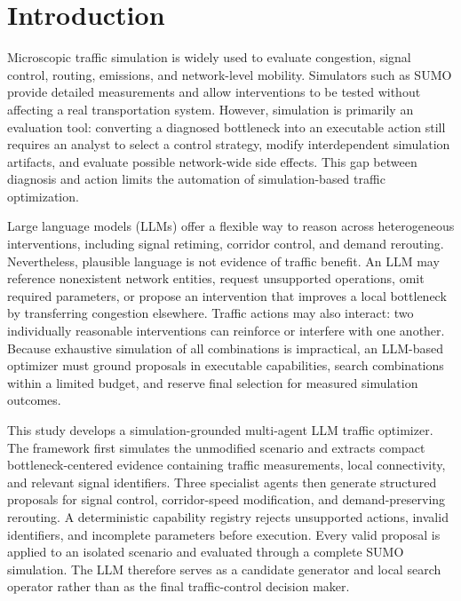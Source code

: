\section{Introduction}
\label{sec:intro}

Microscopic traffic simulation is widely used to evaluate congestion, signal
control, routing, emissions, and network-level mobility.  Simulators such as
SUMO provide detailed measurements and allow interventions to be tested without
affecting a real transportation system.  However, simulation is primarily an
evaluation tool: converting a diagnosed bottleneck into an executable action
still requires an analyst to select a control strategy, modify interdependent
simulation artifacts, and evaluate possible network-wide side effects.  This
gap between diagnosis and action limits the automation of simulation-based
traffic optimization.

Large language models (LLMs) offer a flexible way to reason across heterogeneous
interventions, including signal retiming, corridor control, and demand
rerouting.  Nevertheless, plausible language is not evidence of traffic
benefit.  An LLM may reference nonexistent network entities, request unsupported
operations, omit required parameters, or propose an intervention that improves
a local bottleneck by transferring congestion elsewhere.  Traffic actions may
also interact: two individually reasonable interventions can reinforce or
interfere with one another.  Because exhaustive simulation of all combinations
is impractical, an LLM-based optimizer must ground proposals in executable
capabilities, search combinations within a limited budget, and reserve final
selection for measured simulation outcomes.

This study develops a simulation-grounded multi-agent LLM traffic optimizer.
The framework first simulates the unmodified scenario and extracts compact
bottleneck-centered evidence containing traffic measurements, local
connectivity, and relevant signal identifiers.  Three specialist agents then
generate structured proposals for signal control, corridor-speed modification,
and demand-preserving rerouting.  A deterministic capability registry rejects
unsupported actions, invalid identifiers, and incomplete parameters before
execution.  Every valid proposal is applied to an isolated scenario and
evaluated through a complete SUMO simulation.  The LLM therefore serves as a
candidate generator and local search operator rather than as the final
traffic-control decision maker.

